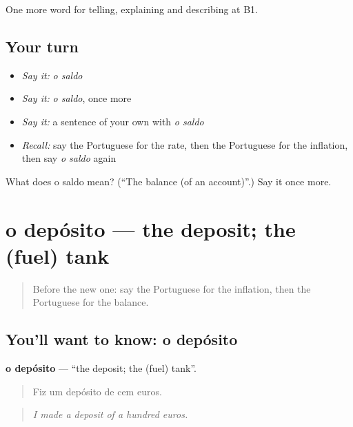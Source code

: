 \begin{grammarlens}[title={What you've built}]
One more word for telling, explaining and describing at B1.
\end{grammarlens}

\subsection*{Your turn}
\begin{itemize}
\raggedright
  \item \emph{Say it:} \emph{o saldo}
  \item \emph{Say it:} \emph{o saldo}, once more
  \item \emph{Say it:} a sentence of your own with \emph{o saldo}
  \item \emph{Recall:} say the Portuguese for the rate, then the Portuguese for the inflation, then say \emph{o saldo} again
\end{itemize}

\begin{tcolorbox}[breakable,colback=teal!4,colframe=teal!35!black,title={Before you move on}]
What does o saldo mean? (\textquotedblleft{}The balance (of an account)\textquotedblright{}.) Say it once more.
\end{tcolorbox}
\section[o depósito]{o depósito — the deposit; the (fuel) tank}

\label{lesson:PT-C393-deposito}



\begin{quote}
Before the new one: say the Portuguese for the inflation, then the Portuguese for the balance.
\end{quote}

\subsection*{You'll want to know: o depósito}
\textbf{o depósito} — \textquotedblleft{}the deposit; the (fuel) tank\textquotedblright{}.

\begin{quote}
Fiz um depósito de cem euros.
\end{quote}

\begin{quote}
\emph{I made a deposit of a hundred euros.}
\end{quote}

